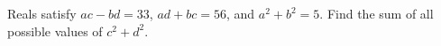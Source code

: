 Reals satisfy $ac-bd=33$, $ad+bc=56$, and $a^2+b^2=5$. Find the sum of all possible values of $c^2+d^2$.

